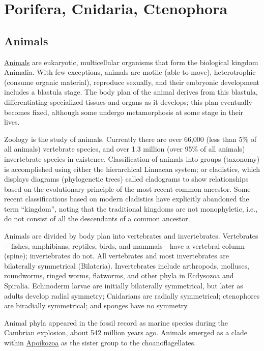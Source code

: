 \chapter{Porifera, Cnidaria,
Ctenophora}\label{porifera-cnidaria-ctenophora}

\section{Animals}\label{animals}

\href{https://en.wikipedia.org/wiki/Animal}{Animals} are eukaryotic,
multicellular organisms that form the biological kingdom Animalia. With
few exceptions, animals are motile (able to move), heterotrophic
(consume organic material), reproduce sexually, and their embryonic
development includes a blastula stage. The body plan of the animal
derives from this blastula, differentiating specialized tissues and
organs as it develops; this plan eventually becomes fixed, although some
undergo metamorphosis at some stage in their lives.

Zoology is the study of animals. Currently there are over 66,000
(less than 5\% of all animals) vertebrate species, and over 1.3 million
(over 95\% of all animals) invertebrate species in existence.
Classification of animals into groups (taxonomy) is accomplished using
either the hierarchical Linnaean system; or cladistics, which displays
diagrams (phylogenetic trees) called cladograms to show relationships
based on the evolutionary principle of the most recent common ancestor.
Some recent classifications based on modern cladistics have explicitly
abandoned the term ``kingdom'', noting that the traditional kingdoms are
not monophyletic, i.e., do not consist of all the descendants of a
common ancestor.

Animals are divided by body plan into vertebrates and invertebrates.
Vertebrates---fishes, amphibians, reptiles, birds, and mammals---have a
vertebral column (spine); invertebrates do not. All vertebrates and most
invertebrates are bilaterally symmetrical (Bilateria). Invertebrates
include arthropods, molluscs, roundworms, ringed worms, flatworms, and
other phyla in Ecdysozoa and Spiralia. Echinoderm larvae are initially
bilaterally symmetrical, but later as adults develop radial symmetry;
Cnidarians are radially symmetrical; ctenophores are biradially
symmetrical; and sponges have no symmetry.

Animal phyla appeared in the fossil record as marine species during the
Cambrian explosion, about 542 million years ago. Animals emerged as a
clade within \href{https://en.wikipedia.org/wiki/Apoikozoa}{Apoikozoa} as the sister group to the choanoflagellates.

